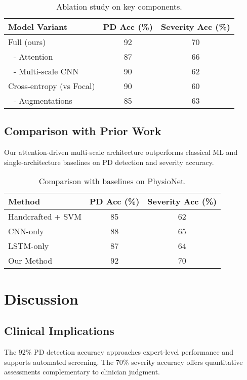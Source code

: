 \documentclass[conference]{IEEEtran}
\begin{document}
\begin{table*}[t]
\centering
\caption{Ablation study on key components.}
\label{tab:ablation}
\begin{tabular}{lcc}
\toprule
Model Variant & PD Acc (\%) & Severity Acc (\%) \\
\midrule
Full (ours)              & 92 & 70 \\
\,\, - Attention         & 87 & 66 \\
\,\, - Multi-scale CNN    & 90 & 62 \\
Cross-entropy (vs Focal) & 90 & 60 \\
\,\, - Augmentations      & 85 & 63 \\
\bottomrule
\end{tabular}
\end{table*}

\subsection{Comparison with Prior Work}
Our attention-driven multi-scale architecture outperforms classical ML and single-architecture baselines on PD detection and severity accuracy.

\begin{table*}[t]
\centering
\caption{Comparison with baselines on PhysioNet.}
\label{tab:comparison}
\begin{tabular}{lcc}
\toprule
Method & PD Acc (\%) & Severity Acc (\%) \\
\midrule
Handcrafted + SVM & 85 & 62 \\
CNN-only          & 88 & 65 \\
LSTM-only         & 87 & 64 \\
Our Method        & 92 & 70 \\
\bottomrule
\end{tabular}
\end{table*}

\section{Discussion}
\subsection{Clinical Implications}
The 92\% PD detection accuracy approaches expert-level performance and supports automated screening. The 70\% severity accuracy offers quantitative assessments complementary to clinician judgment.
\end{document}
